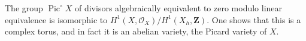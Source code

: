 The group $\operatorname{Pic}^{\circ} X$ of divisors algebraically equivalent to zero modulo linear equivalence is isomorphic to $H^1(X, \mathcal{O}_X)/H^1(X_h, \mathbf{Z})$. One shows that this is a complex torus, and in fact it is an abelian variety, the Picard variety of $X$.

